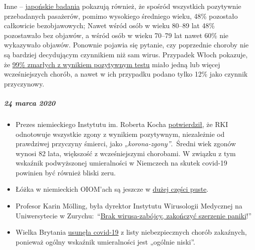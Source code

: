 \begin{itemize}
  Inne --
  \href{https://www.niid.go.jp/niid/en/2019-ncov-e/9407-covid-dp-fe-01.html}{japońskie
  badania} pokazują również, że spośród wszystkich pozytywnie
  przebadanych pasażerów, pomimo wysokiego średniego wieku, 48\%
  pozostało całkowicie bezobjawowych; Nawet wśród osób w wieku 80--89
  lat 48\% pozostawało bez objawów, a wśród osób w wieku 70--79 lat
  nawet 60\% nie wykazywało objawów. Ponownie pojawia się pytanie, czy
  poprzednie choroby nie są bardziej decydującym czynnikiem niż sam
  wirus. Przypadek Włoch pokazuje, że
  \href{https://www.bloomberg.com/news/articles/2020-03-18/99-of-those-who-died-from-virus-had-other-illness-italy-says}{99\%
  zmarłych z wynikiem pozytywnym testu} miało jedną lub więcej
  wcześniejszych chorób, a nawet w ich przypadku podano tylko 12\% jako
  czynnik przyczynowy.
\end{itemize}

\hypertarget{24-marca-2020}{%
\subparagraph{\texorpdfstring{\textbf{24 marca
2020}}{24 marca 2020}}\label{24-marca-2020}}

\begin{itemize}
\tightlist
\item
  Prezes niemieckiego Instytutu im. Roberta Kocha
  \href{https://swprs.org/rki-relativiert-corona-todesfaelle/}{potwierdził},
  że RKI odnotowuje wszystkie zgony z wynikiem pozytywnym, niezależnie
  od prawdziwej przyczyny śmierci, jako \emph{„korona-zgony''}.~Średni
  wiek zgonów wynosi 82 lata, większość z wcześniejszymi chorobami. W
  związku z tym wskaźnik podwyższonej umieralności w Niemczech na skutek
  covid-19 powinien być również bliski zeru.
\item
  Łóżka w niemieckich OIOM'ach są jeszcze w
  \href{https://www.aargauerzeitung.ch/aargau/kanton-aargau/erst-3-von-100-aargauer-betten-der-intensivstationen-sind-belegt-so-ruesten-sich-die-spitaeler-auf-die-epidemie-137332716}{dużej
  części puste}.
\item
  Profesor Karin Mölling, była dyrektor Instytutu Wirusologii Medycznej
  na Uniwersytecie w
  Zurychu:~``\href{https://www.radioeins.de/programm/sendungen/die_profis/archivierte_sendungen/beitraege/corona-virus-kein-killervirus.html}{Brak
  wirusa-zabójcy, zakończyć szerzenie paniki}!''
\item
  Wielka Brytania
  \href{https://www.gov.uk/guidance/high-consequence-infectious-diseases-hcid\#status-of-covid-19}{usunęła
  covid-19} z listy niebezpiecznych chorób zakaźnych, ponieważ ogólny
  wskaźnik umieralności jest „ogólnie niski''.
\end{itemize}

